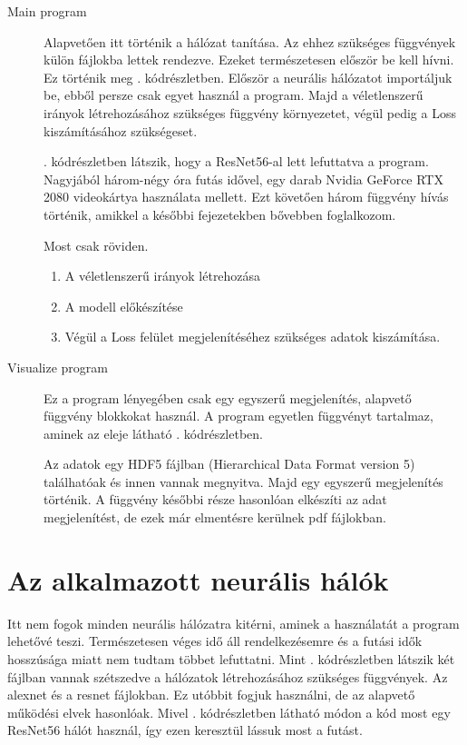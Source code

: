 \documentclass[twoside,a4paper]{refart}
\begin{document}
\begin{description}
	
	\item[Main program]
	Alapvetően itt történik a hálózat tanítása. Az ehhez szükséges függvények külön fájlokba lettek rendezve. Ezeket természetesen először be kell hívni. Ez történik meg . kódrészletben. Először a neurális hálózatot importáljuk be, ebből persze csak egyet használ a program. Majd a véletlenszerű irányok létrehozásához szükséges függvény környezetet, végül pedig a Loss kiszámításához szükségeset.
	{\small }
	
	. kódrészletben látszik, hogy a ResNet56-al lett lefuttatva a program. Nagyjából három-négy óra futás idővel, egy darab Nvidia GeForce RTX 2080 videokártya használata mellett. Ezt követően három függvény hívás történik, amikkel a későbbi fejezetekben bővebben foglalkozom.
	
	{\small }
	
	Most csak röviden.
	\begin{enumerate}
		\item A véletlenszerű irányok létrehozása
		\item A modell előkészítése
		\item Végül a Loss felület megjelenítéséhez szükséges adatok kiszámítása. 
	\end{enumerate}
	
	
	\item[Visualize program]
	Ez a program lényegében csak egy egyszerű megjelenítés, alapvető függvény blokkokat használ. A program egyetlen függvényt tartalmaz, aminek az eleje látható . kódrészletben.
	
	{\small }
	
	Az adatok egy HDF5 fájlban (Hierarchical Data Format version 5) találhatóak és innen vannak megnyitva. Majd egy egyszerű megjelenítés történik. A függvény későbbi része hasonlóan elkészíti az adat megjelenítést, de ezek már elmentésre kerülnek pdf fájlokban.
	
\end{description} 

\section{Az alkalmazott neurális hálók}
	Itt nem fogok minden neurális hálózatra kitérni, aminek a használatát a program lehetővé teszi. Természetesen véges idő áll rendelkezésemre és a futási idők hosszúsága miatt nem tudtam többet lefuttatni. Mint . kódrészletben látszik két fájlban vannak szétszedve a hálózatok létrehozásához szükséges függvények. Az alexnet és a resnet fájlokban. Ez utóbbit fogjuk használni, de az alapvető működési elvek hasonlóak. Mivel . kódrészletben látható módon a kód most egy ResNet56 hálót használ, így ezen keresztül lássuk most a futást. 
\end{document}
